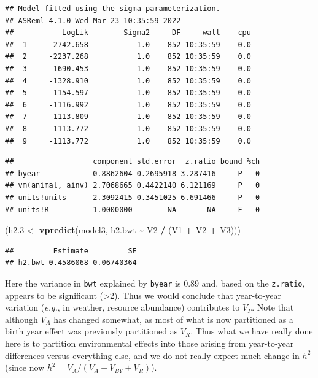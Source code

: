 \documentclass[
  12pt,
]{book}
\newenvironment{Shaded}{\begin{snugshade}}{\end{snugshade}}
\newcommand{\FloatTok}[1]{\textcolor[rgb]{0.00,0.00,0.81}{#1}}
\newcommand{\KeywordTok}[1]{\textcolor[rgb]{0.13,0.29,0.53}{\textbf{#1}}}
\newcommand{\NormalTok}[1]{#1}
\newcommand{\OperatorTok}[1]{\textcolor[rgb]{0.81,0.36,0.00}{\textbf{#1}}}
\newcommand{\StringTok}[1]{\textcolor[rgb]{0.31,0.60,0.02}{#1}}
\begin{document}
\begin{verbatim}
## Model fitted using the sigma parameterization.
## ASReml 4.1.0 Wed Mar 23 10:35:59 2022
##           LogLik        Sigma2     DF     wall    cpu
##  1     -2742.658           1.0    852 10:35:59    0.0
##  2     -2237.268           1.0    852 10:35:59    0.0
##  3     -1690.453           1.0    852 10:35:59    0.0
##  4     -1328.910           1.0    852 10:35:59    0.0
##  5     -1154.597           1.0    852 10:35:59    0.0
##  6     -1116.992           1.0    852 10:35:59    0.0
##  7     -1113.809           1.0    852 10:35:59    0.0
##  8     -1113.772           1.0    852 10:35:59    0.0
##  9     -1113.772           1.0    852 10:35:59    0.0
\end{verbatim}

\begin{Shaded}
\end{Shaded}

\begin{verbatim}
##                  component std.error  z.ratio bound %ch
## byear            0.8862604 0.2695918 3.287416     P   0
## vm(animal, ainv) 2.7068665 0.4422140 6.121169     P   0
## units!units      2.3092415 0.3451025 6.691466     P   0
## units!R          1.0000000        NA       NA     F   0
\end{verbatim}

\begin{Shaded}
\begin{Highlighting}[]
\NormalTok{(h2}\FloatTok{.3}\NormalTok{ \textless{}{-}}\StringTok{ }\KeywordTok{vpredict}\NormalTok{(model3, h2.bwt }\OperatorTok{\textasciitilde{}}\StringTok{ }\NormalTok{V2 }\OperatorTok{/}\StringTok{ }\NormalTok{(V1 }\OperatorTok{+}\StringTok{ }\NormalTok{V2 }\OperatorTok{+}\StringTok{ }\NormalTok{V3)))}
\end{Highlighting}
\end{Shaded}

\begin{verbatim}
##         Estimate         SE
## h2.bwt 0.4586068 0.06740364
\end{verbatim}

Here the variance in \texttt{bwt} explained by \texttt{byear} is 0.89 and, based on the \texttt{z.ratio}, appears to be significant (\textgreater2). Thus we would conclude that year-to-year variation (\emph{e.g.}, in weather, resource abundance) contributes to \(V_P\). Note that although \(V_A\) has changed somewhat, as most of what is now partitioned as a birth year effect was previously partitioned as \(V_R\). Thus what we have really done here is to partition environmental effects into those arising from year-to-year differences versus everything else, and we do not really expect much change in \(h^2\) (since now \(h^2 = V_A/ (V_A+V_{BY}+V_R)\)).
\end{document}
